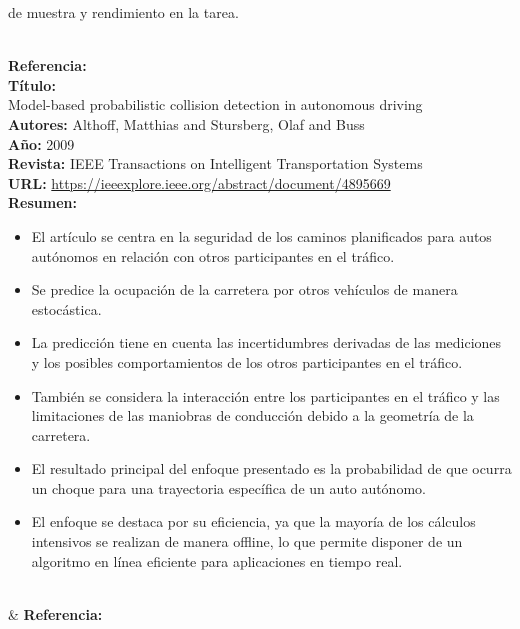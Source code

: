 \documentclass[10pt,letterpaper,final]{article}
\begin{document}
\begin{longtable}
\begin{itemize}
            de muestra y rendimiento en la tarea.
        \end{itemize} \\
        \hline
        \pagebreak
        \hline
        \noindent \textbf{Referencia:}~\cite{bachute2021autonomous} \\
        \textbf{Título:} \\
        Model-based probabilistic collision detection in autonomous driving \\
        \textbf{Autores:}
        Althoff, Matthias and Stursberg, Olaf and Buss \\
        \textbf{Año:}
        2009 \\
        \textbf{Revista:}
        IEEE Transactions on Intelligent Transportation Systems \\
        \textbf{URL:}
        \url{https://ieeexplore.ieee.org/abstract/document/4895669} \\
        \textbf{Resumen:} \\
        \begin{itemize}
            \item El artículo se centra en la seguridad de los caminos planificados para autos autónomos en relación con otros participantes en el tráfico.
            \item Se predice la ocupación de la carretera por otros vehículos de manera estocástica.
            \item La predicción tiene en cuenta las incertidumbres derivadas de las mediciones y los posibles comportamientos
            de los otros participantes en el tráfico.
            \item También se considera la interacción entre los participantes en el tráfico y las limitaciones de las maniobras
            de conducción debido a la geometría de la carretera.
            \item El resultado principal del enfoque presentado es la probabilidad de que ocurra un choque para una trayectoria específica de un auto autónomo.
            \item El enfoque se destaca por su eficiencia, ya que la mayoría de los cálculos intensivos se realizan de manera
            offline, lo que permite disponer de un algoritmo en línea eficiente para aplicaciones en tiempo real.
        \end{itemize} \\
        \hline
        \pagebreak
        \hline
        & \textbf{Referencia:}~\cite{cai2021vision}     \\

\end{longtable}
\end{document}
